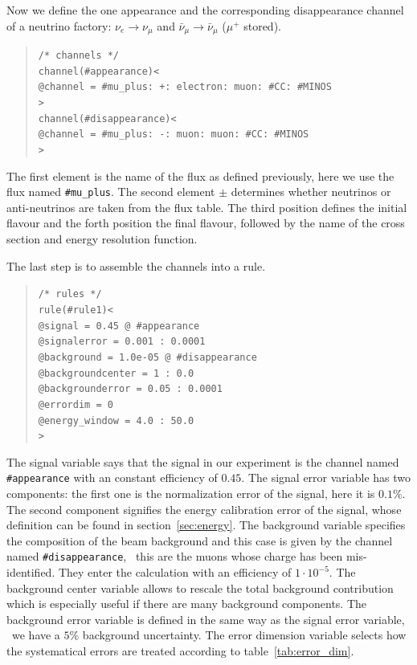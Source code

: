 Now we define the one appearance and the corresponding disappearance 
channel of a neutrino factory: 
$\nu_e\rightarrow\nu_\mu$  and $\bar\nu_\mu\rightarrow\bar\nu_\mu$ 
($\mu^+$ stored).
\begin{quote}
{\tt /* channels */}\\
{\tt channel(\#appearance)<}\\
{\tt \tb @channel = \#mu\_plus: +: electron: muon: \#CC: \#MINOS}\\
{\tt >}\\
{\tt channel(\#disappearance)<}\\
{\tt \tb @channel = \#mu\_plus: -: muon: muon: \#CC: \#MINOS}\\
{\tt >}
\end{quote}
The first element is the name of the flux as defined previously, here we use
the flux named {\tt \#mu\_plus}. The second element $\pm$ determines whether 
neutrinos or anti-neutrinos are
taken from the flux table. The third position defines the initial flavour
and the forth position the final flavour, followed by the name of the cross
section and energy resolution function.

The last step is to assemble the channels into a rule.
\begin{quote}
{\tt /* rules */}\\
{\tt rule(\#rule1)<}\\
{\tt \tb @signal = 0.45 @ \#appearance}\\
{\tt \tb @signalerror = 0.001 : 0.0001}\\
{\tt \tb @background = 1.0e-05 @ \#disappearance}\\
{\tt \tb @backgroundcenter = 1 : 0.0}\\
{\tt \tb @backgrounderror = 0.05 : 0.0001}\\
{\tt \tb @errordim = 0}\\
{\tt \tb @energy\_window = 4.0 : 50.0}\\
{\tt >}
\end{quote}
The signal variable says that the signal in our experiment is the 
channel named {\tt \#appearance} with an constant efficiency of $0.45$.
The signal error variable has two components: the first one is the
normalization error of the signal, here it is $0.1\%$. The second component
signifies the energy calibration error of the signal, whose definition 
can be found in section~\ref{sec:energy}. The background variable
specifies the composition of the beam background and this case is
given by the channel named {\tt \#disappearance}, \ie\ this are
the muons whose charge has been mis-identified. They enter the calculation
with an efficiency of $1\cdot 10^{-5}$. The background center variable allows
to rescale the total background contribution which is especially useful if
there are many background components. 
The background error variable is defined in the same way as the signal error
variable, \ie\ we have a $5\%$ background uncertainty.
The error dimension variable selects how
the systematical errors are treated according to table~\ref{tab:error_dim}. 


